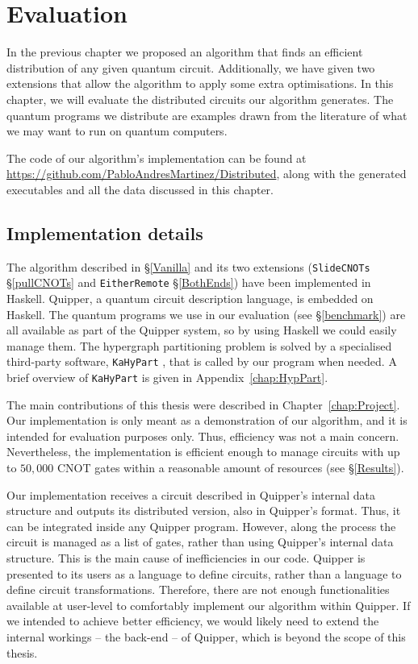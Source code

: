 \chapter{Evaluation}
\label{chap:Results}

In the previous chapter we proposed an algorithm that finds an efficient distribution of any given quantum circuit. Additionally, we have given two extensions that allow the algorithm to apply some extra optimisations. In this chapter, we will evaluate the distributed circuits our algorithm generates. The quantum programs we distribute are examples drawn from the literature of what we may want to run on quantum computers.

The code of our algorithm's implementation can be found at {\small \url{https://github.com/PabloAndresMartinez/Distributed}}, along with the generated executables and all the data discussed in this chapter. 


\section{Implementation details}
\label{implementation}

The algorithm described in \S\ref{Vanilla} and its two extensions (\texttt{SlideCNOTs} \S\ref{pullCNOTs} and \texttt{EitherRemote} \S\ref{BothEnds}) have been implemented in Haskell. Quipper, a quantum circuit description language, is embedded on Haskell. The quantum programs we use in our evaluation (see \S\ref{benchmark}) are all available as part of the Quipper system, so by using Haskell we could easily manage them. The hypergraph partitioning problem is solved by a specialised third-party software, \texttt{KaHyPart} \citep{KaHyPart}, that is called by our program when needed. A brief overview of \texttt{KaHyPart} is given in Appendix~\ref{chap:HypPart}. 

The main contributions of this thesis were described in Chapter~\ref{chap:Project}. Our implementation is only meant as a demonstration of our algorithm, and it is intended for evaluation purposes only. Thus, efficiency was not a main concern. Nevertheless, the implementation is efficient enough to manage circuits with up to \(50,000\) CNOT gates within a reasonable amount of resources (see \S\ref{Results}).

Our implementation receives a circuit described in Quipper's internal data structure and outputs its distributed version, also in Quipper's format. Thus, it can be integrated inside any Quipper program. However, along the process the circuit is managed as a list of gates, rather than using Quipper's internal data structure. This is the main cause of inefficiencies in our code. Quipper is presented to its users as a language to define circuits, rather than a language to define circuit transformations. Therefore, there are not enough functionalities available at user-level to comfortably implement our algorithm within Quipper. If we intended to achieve better efficiency, we would likely need to extend the internal workings -- the back-end -- of Quipper, which is beyond the scope of this thesis.

